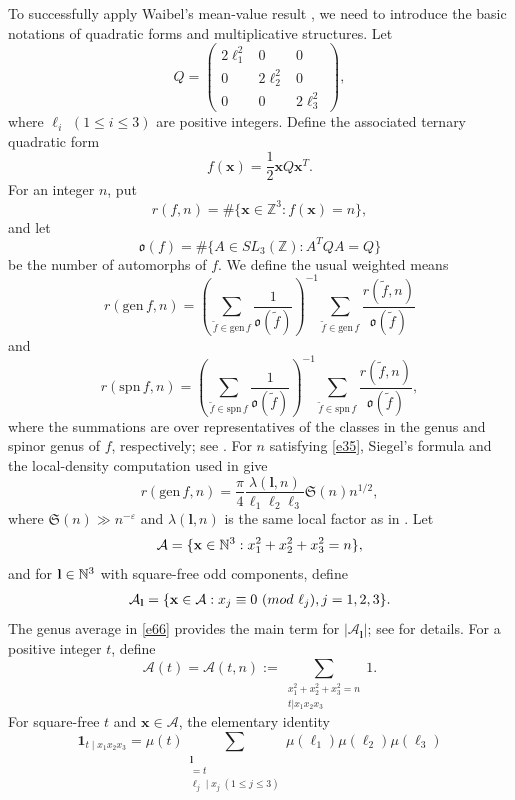 \documentclass[10pt,a4paper]{amsart}
\numberwithin{equation}{section}
\def\pmod #1{\ ({\rm{mod}}\ #1)}
\begin{document}
To successfully apply Waibel's mean-value result \cite[Lemma 17]{Wa}, we need to introduce the basic notations of quadratic forms and multiplicative structures.
Let
\[
Q=\begin{pmatrix}
2\ell_1^2&0&0\\
0&2\ell_2^2&0\\
0&0&2\ell_3^2
\end{pmatrix},
\]
where $\ell_i$ $(1\leq i\leq3)$ are positive integers. Define the associated ternary quadratic form
\[
f(\mathbf x)=\frac12\mathbf xQ\mathbf x^T.
\]
For an integer $n$, put
\[
r(f,n)=\#\{\mathbf x\in\mathbb Z^3:f(\mathbf x)=n\},
\]
and let
\[
\mathfrak o(f)=\#\{A\in SL_3(\mathbb Z):A^TQA=Q\}
\]
be the number of automorphs of $f$. We define the usual weighted means
\[
r(\mathrm{gen}\,f,n)=
\left(\sum_{\widetilde f\in\mathrm{gen}\,f}\frac1{\mathfrak o(\widetilde f)}\right)^{-1}
\sum_{\widetilde f\in\mathrm{gen}\,f}\frac{r(\widetilde f,n)}{\mathfrak o(\widetilde f)}
\]
and
\[
r(\mathrm{spn}\,f,n)=
\left(\sum_{\widetilde f\in\mathrm{spn}\,f}\frac1{\mathfrak o(\widetilde f)}\right)^{-1}
\sum_{\widetilde f\in\mathrm{spn}\,f}\frac{r(\widetilde f,n)}{\mathfrak o(\widetilde f)},
\]
where the summations are over representatives of the classes in the genus and spinor genus of $f$, respectively; see \cite[Section 102]{OM}.
For $n$ satisfying \eqref{e35}, Siegel's formula and the local-density computation used in \cite{Lv} give
\begin{equation}\label{e66}
r(\mathrm{gen}\,f,n)=\frac{\pi}{4}\frac{\lambda(\mathbf l,n)}{\ell_1\ell_2\ell_3}\mathfrak S(n)n^{1/2},
\end{equation}
where $\mathfrak S(n)\gg n^{-\varepsilon}$ and $\lambda(\mathbf l,n)$ is the same local factor as in \cite[(3.10)]{Lv}.
Let
    \[
    \mathcal{A} = \{ {\bf x} \in \mathbb{N}^3 : x_1^2 + x_2^2 + x_3^2 = n \},
    \]
    and for \( {\bf l} \in \mathbb{N}^3 \) with square-free odd components, define
    \begin{align*}
    \mathcal{A}_{\bf l} = \{ {\bf x} \in \mathcal{A} : x_j\equiv0\pmod{\ell_j}, j=1,2,3 \}.
    \end{align*}
The genus average in \eqref{e66} provides the main term for $|\mathcal A_{\mathbf l}|$; see \cite{BB} for details.
For a positive integer $t$, define
\[
\mathcal{A}(t) = \mathcal{A}(t, n) := \sum_{\substack{ x_1^2 + x_2^2 + x_3^2 = n \\ t | x_1 x_2 x_3}} 1.
\]
For square-free $t$ and $\mathbf x\in\mathcal A$, the elementary identity
\[
\mathbf 1_{t\mid x_1x_2x_3}
=\mu(t)\sum_{\substack{\mathbf l\\ [\ell_1,\ell_2,\ell_3]=t\\ \ell_j\mid x_j\ (1\leq j\leq3)}}
\mu(\ell_1)\mu(\ell_2)\mu(\ell_3)
\]
\end{document}
